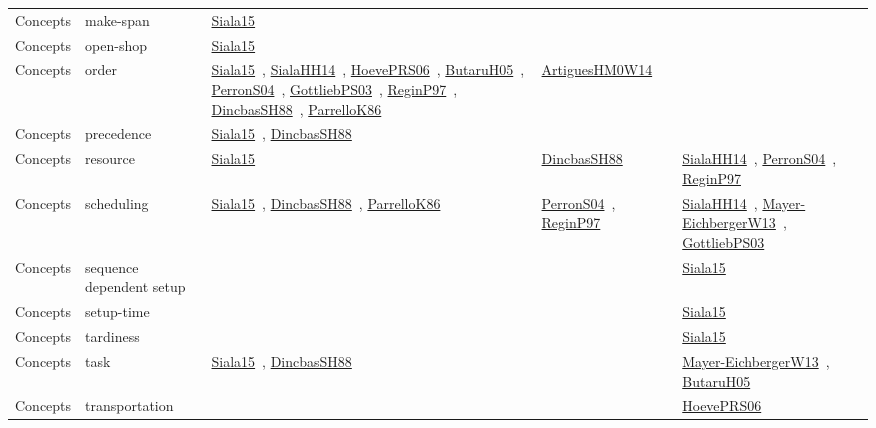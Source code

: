 {\begin{longtable}{lp{3cm}>{\raggedright\arraybackslash}p{6cm}>{\raggedright\arraybackslash}p{6cm}>{\raggedright\arraybackslash}p{8cm}}
Concepts & make-span & \href{../cars/works/Siala15.pdf}{Siala15}~\cite{Siala15} &  & \\
Concepts & open-shop & \href{../cars/works/Siala15.pdf}{Siala15}~\cite{Siala15} &  & \\
Concepts & order & \href{../cars/works/Siala15.pdf}{Siala15}~\cite{Siala15}, \href{../cars/works/SialaHH14.pdf}{SialaHH14}~\cite{SialaHH14}, \href{../cars/works/HoevePRS06.pdf}{HoevePRS06}~\cite{HoevePRS06}, \href{../cars/works/ButaruH05.pdf}{ButaruH05}~\cite{ButaruH05}, \href{../cars/works/PerronS04.pdf}{PerronS04}~\cite{PerronS04}, \href{../cars/works/GottliebPS03.pdf}{GottliebPS03}~\cite{GottliebPS03}, \href{../cars/works/ReginP97.pdf}{ReginP97}~\cite{ReginP97}, \href{../cars/works/DincbasSH88.pdf}{DincbasSH88}~\cite{DincbasSH88}, \href{../cars/works/ParrelloK86.pdf}{ParrelloK86}~\cite{ParrelloK86} & \href{../cars/works/ArtiguesHM0W14.pdf}{ArtiguesHM0W14}~\cite{ArtiguesHM0W14} & \\
Concepts & precedence & \href{../cars/works/Siala15.pdf}{Siala15}~\cite{Siala15}, \href{../cars/works/DincbasSH88.pdf}{DincbasSH88}~\cite{DincbasSH88} &  & \\
Concepts & resource & \href{../cars/works/Siala15.pdf}{Siala15}~\cite{Siala15} & \href{../cars/works/DincbasSH88.pdf}{DincbasSH88}~\cite{DincbasSH88} & \href{../cars/works/SialaHH14.pdf}{SialaHH14}~\cite{SialaHH14}, \href{../cars/works/PerronS04.pdf}{PerronS04}~\cite{PerronS04}, \href{../cars/works/ReginP97.pdf}{ReginP97}~\cite{ReginP97}\\
Concepts & scheduling & \href{../cars/works/Siala15.pdf}{Siala15}~\cite{Siala15}, \href{../cars/works/DincbasSH88.pdf}{DincbasSH88}~\cite{DincbasSH88}, \href{../cars/works/ParrelloK86.pdf}{ParrelloK86}~\cite{ParrelloK86} & \href{../cars/works/PerronS04.pdf}{PerronS04}~\cite{PerronS04}, \href{../cars/works/ReginP97.pdf}{ReginP97}~\cite{ReginP97} & \href{../cars/works/SialaHH14.pdf}{SialaHH14}~\cite{SialaHH14}, \href{../cars/works/Mayer-EichbergerW13.pdf}{Mayer-EichbergerW13}~\cite{Mayer-EichbergerW13}, \href{../cars/works/GottliebPS03.pdf}{GottliebPS03}~\cite{GottliebPS03}\\
Concepts & sequence dependent setup &  &  & \href{../cars/works/Siala15.pdf}{Siala15}~\cite{Siala15}\\
Concepts & setup-time &  &  & \href{../cars/works/Siala15.pdf}{Siala15}~\cite{Siala15}\\
Concepts & tardiness &  &  & \href{../cars/works/Siala15.pdf}{Siala15}~\cite{Siala15}\\
Concepts & task & \href{../cars/works/Siala15.pdf}{Siala15}~\cite{Siala15}, \href{../cars/works/DincbasSH88.pdf}{DincbasSH88}~\cite{DincbasSH88} &  & \href{../cars/works/Mayer-EichbergerW13.pdf}{Mayer-EichbergerW13}~\cite{Mayer-EichbergerW13}, \href{../cars/works/ButaruH05.pdf}{ButaruH05}~\cite{ButaruH05}\\
Concepts & transportation &  &  & \href{../cars/works/HoevePRS06.pdf}{HoevePRS06}~\cite{HoevePRS06}\\
\end{longtable}
}

